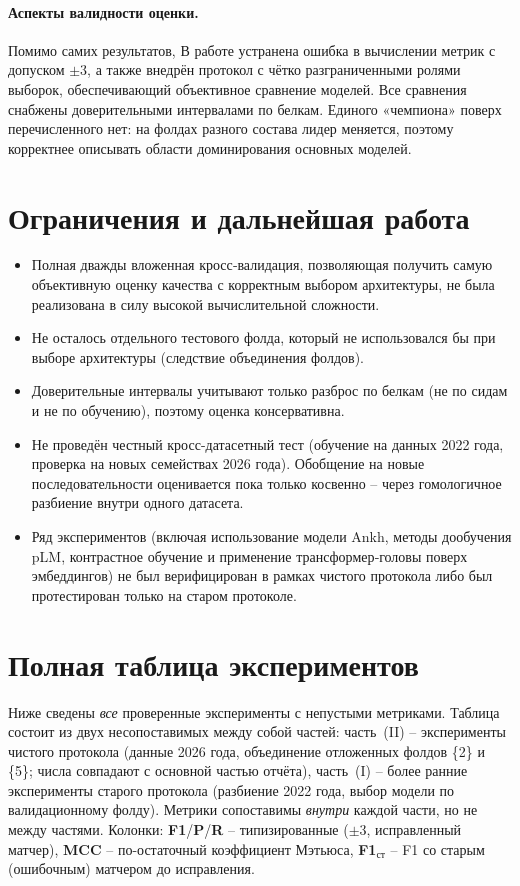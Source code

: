 \documentclass{article}
\begin{document}
\paragraph{Аспекты валидности оценки.} Помимо самих результатов, В работе устранена ошибка в вычислении метрик с допуском $\pm3$, а также внедрён протокол с чётко разграниченными ролями выборок, обеспечивающий объективное сравнение моделей. Все сравнения снабжены доверительными интервалами по белкам. Единого «чемпиона» поверх перечисленного нет: на фолдах разного состава лидер меняется, поэтому корректнее описывать области доминирования основных моделей.

\section{Ограничения и дальнейшая работа}
\begin{itemize}
  \item Полная дважды вложенная кросс‑валидация, позволяющая получить самую объективную оценку качества с корректным выбором архитектуры, не была реализована в силу высокой вычислительной сложности.
  \item Не осталось отдельного тестового фолда, который не использовался бы при выборе архитектуры (следствие объединения фолдов).
  \item Доверительные интервалы учитывают только разброс по белкам (не по сидам и не по обучению), поэтому оценка консервативна.
  \item Не проведён честный кросс-датасетный тест (обучение на данных 2022 года, проверка на новых семействах 2026 года). Обобщение на новые последовательности оценивается пока только косвенно -- через гомологичное разбиение внутри одного датасета.
  \item Ряд экспериментов (включая использование модели Ankh, методы дообучения pLM, контрастное обучение и применение трансформер‑головы поверх эмбеддингов) не был верифицирован в рамках чистого протокола либо был протестирован только на старом протоколе.
\end{itemize}

\section{Полная таблица экспериментов}\label{sec:fulltable}
Ниже сведены \emph{все} проверенные эксперименты с непустыми метриками. Таблица состоит из двух несопоставимых между собой частей: часть~(II) -- эксперименты чистого протокола (данные 2026 года, объединение отложенных фолдов \{2\} и \{5\}; числа совпадают с основной частью отчёта), часть~(I) -- более ранние эксперименты старого протокола (разбиение 2022 года, выбор модели по валидационному фолду). Метрики сопоставимы \emph{внутри} каждой части, но не между частями. Колонки: \textbf{F1}/\textbf{P}/\textbf{R} -- типизированные ($\pm3$, исправленный матчер), \textbf{MCC} -- по-остаточный коэффициент Мэтьюса, \textbf{F1$_{\text{ст}}$} -- F1 со старым (ошибочным) матчером до исправления.



\newpage


\end{document}
